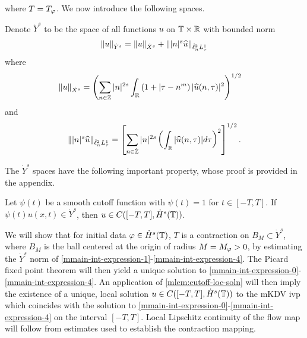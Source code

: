%
%
where $T = T_{\varphi}$. We now introduce the following spaces. 
%
\begin{definition}
	Denote $\dot{Y}^s$ to be the space of all
	functions $u$ on $\mathbb{T} \times \mathbb{R}$ with
	bounded norm
\begin{equation}
	\label{mY-s-norm}
	\begin{split}
		\|u\|_{\dot{Y}^s} = \|u\|_{\dot{X}^s} + \||n|^s \widehat{ u}\|_{ \dot{\ell}^2_n L^1_\tau }
	\end{split}
\end{equation}
%
%
%
%
where
%
\begin{equation}
	\label{mX^s-norm}
	\begin{split}
		& \|u\|_{\dot{X}^s}
		= \left ( \sum_{n\in \mathbb{Z}} |n|^{2s} \int_{\mathbb{R}} \left ( 1 + | 
		\tau - n^m \right ) | \widehat{u} ( n, \tau ) |^2
		\right )^{1/2}
	\end{split}
\end{equation}
and
%
%
\begin{equation}
	\label{mE-norm}
	\| | n |^{s} \widehat{u}\|_{ \dot{\ell}^2_n L^1_\tau } = \left[ \sum_{n \in \dot{\mathbb{Z}}}| n |^{2s} \left(
	\int_{\mathbb{R}}| \widehat{u}(n, \tau) |d \tau \right)^{2} \right]^{1/2}.
\end{equation}
%
%
%
%
\end{definition}
The $\dot{Y}^s$ spaces have the following important property, whose proof
is provided in the appendix.
\begin{lemma}
	\label{mlem:cutoff-loc-soln}
	Let $\psi(t)$ be a smooth cutoff function with $\psi(t) =1$ for $t \in [-T, T]$. If
	$\psi(t)u(x,t) \in \dot{Y}^s$, then $u \in C([-T, T], \dot{H}^s(\mathbb{T}))$.
\end{lemma}
%
%
We will 
show that for initial data $\varphi \in \dot{H}^s(\mathbb{T})$, $T$ is a contraction on $B_M 
\subset \dot{Y}^s$, where $B_M$ is the ball centered at the origin of radius $M = 
M_{\varphi}> 0$, by estimating the $\dot{Y}^s$
norm of \eqref{mmain-int-expression-1}-\eqref{mmain-int-expression-4}. The 
Picard fixed point theorem will
then yield a unique solution to
\eqref{mmain-int-expression-0}-\eqref{mmain-int-expression-4}. An application of
\cref{mlem:cutoff-loc-soln} will then imply the existence of a unique, local
solution $u \in C([-T, T], \dot{H}^s(\mathbb{T}))$ to the mKDV ivp which coincides with the solution to
\eqref{mmain-int-expression-0}-\eqref{mmain-int-expression-4} on the interval $[-T, T]$. Local Lipschitz continuity of the flow map will follow
from estimates used to establish the contraction mapping. %
%
%
%
%
%
%
%
